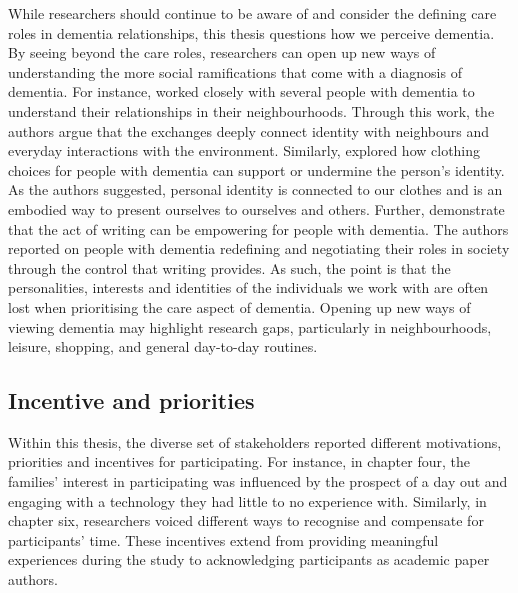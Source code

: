 While researchers should continue to be aware of and consider the defining care roles in dementia relationships, this thesis questions how we perceive dementia. By seeing beyond the care roles, researchers can open up new ways of understanding the more social ramifications that come with a diagnosis of dementia. For instance, \cite{kullberg2017walking} worked closely with several people with dementia to understand their relationships in their neighbourhoods. Through this work, the authors argue that the exchanges deeply connect identity with neighbours and everyday interactions with the environment. Similarly, \cite{twigg_dress_2013} explored how clothing choices for people with dementia can support or undermine the person's identity. As the authors suggested, personal identity is connected to our clothes and is an embodied way to present ourselves to ourselves and others. Further, \cite{ryan_dementia_2009} demonstrate that the act of writing can be empowering for people with dementia. The authors reported on people with dementia redefining and negotiating their roles in society through the control that writing provides. As such, the point is that the personalities, interests and identities of the individuals we work with are often lost when prioritising the care aspect of dementia. Opening up new ways of viewing dementia may highlight research gaps, particularly in neighbourhoods, leisure, shopping, and general day-to-day routines.

\subsection{Incentive and priorities }
\label{incentive}
Within this thesis, the diverse set of stakeholders reported different motivations, priorities and incentives for participating. For instance, in chapter four, the families' interest in participating was influenced by the prospect of a day out and engaging with a technology they had little to no experience with. Similarly, in chapter six, researchers voiced different ways to recognise and compensate for participants' time. These incentives extend from providing meaningful experiences during the study to acknowledging participants as academic paper authors. 

